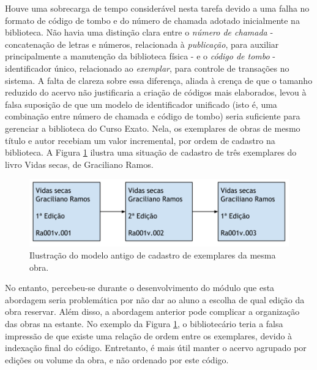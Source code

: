 \documentclass[a4paper]{article}
\begin{document}
Houve uma sobrecarga de tempo considerável nesta tarefa devido a uma falha no formato de código de tombo e do número de chamada adotado inicialmente na biblioteca. Não havia uma distinção clara entre o \textit{número de chamada} - concatenação de letras e números, relacionada à \textit{publicação}, para auxiliar principalmente a manutenção da biblioteca física - e o \textit{código de tombo} - identificador único, relacionado ao \textit{exemplar}, para controle de transações no sistema. A falta de clareza sobre essa diferença, aliada à crença de que o tamanho reduzido do acervo não justificaria a criação de códigos mais elaborados, levou à falsa suposição de que um modelo de identificador unificado (isto é, uma combinação entre número de chamada e código de tombo) seria suficiente para gerenciar a biblioteca do Curso Exato. Nela, os exemplares de obras de mesmo título e autor recebiam um valor incremental, por ordem de cadastro na biblioteca. A Figura \ref{tombo-antigo} ilustra uma situação de cadastro de três exemplares do livro Vidas secas, de Graciliano Ramos.

\begin{figure}[pbth!]
\centering
\caption{Ilustração do modelo antigo de cadastro de exemplares da mesma obra.\label{tombo-antigo}}
\includegraphics[width=120mm]{img/tombo-antigo.png}
\end{figure}

No entanto, percebeu-se durante o desenvolvimento do módulo que esta abordagem seria problemática por não dar ao aluno a escolha de qual edição da obra reservar. Além disso, a abordagem anterior pode complicar a organização das obras na estante. No exemplo da Figura \ref{tombo-antigo}, o bibliotecário teria a falsa impressão de que existe uma relação de ordem entre os exemplares, devido à indexação final do código. Entretanto, é mais útil manter o acervo agrupado por edições ou volume da obra, e não ordenado por este código.
\end{document}
